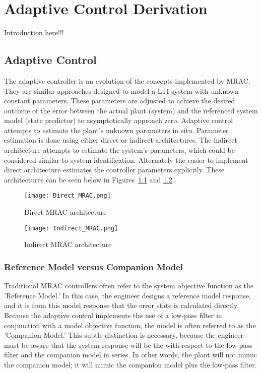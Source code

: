 \chapter{\Lone Adaptive Control Derivation}\label{ch:derivation}

Introduction here!!!

\section{\Lone Adaptive Control}
The \Lone adaptive controller is an evolution of the concepts implemented by \ac{MRAC}.  They are similar approaches designed to model a \ac{LTI} system with unknown constant parameters.  These parameters are adjusted to achieve the desired outcome of the error between the actual plant (system) and the referenced system model (state predictor) to asymptotically approach zero.   Adaptive control attempts to estimate the plant's unknown parameters in situ.  Parameter estimation is done using either direct or indirect architectures.  The indirect architecture attempts to estimate the system's parameters, which could be considered similar to  system identification.  Alternately the easier to implement direct architecture estimates the controller parameters explicitly.  These architectures can be seen below in Figures~\ref{fig:direct_mrac} and \ref{fig:indirect_mrac}.

\begin{figure}[h!]
 \centering
  \texttt{[image: Direct\_MRAC.png]}
  \caption{Direct \ac{MRAC} architecture }
  \label{fig:direct_mrac}
\end{figure}

\begin{figure}[h!]
 \centering
  \texttt{[image: Indirect\_MRAC.png]}
  \caption{Indirect \ac{MRAC} architecture }
  \label{fig:indirect_mrac}
\end{figure}

\subsection{Reference Model versus Companion Model}
Traditional \ac{MRAC} controllers often refer to the system objective function as the 'Reference Model.'  In this case, the engineer designs a reference model response, and it is from this model response that the error state is calculated directly.  Because the \Lone adaptive control implements the use of a low-pass filter in conjunction with a model objective function, the model is often referred to as the 'Companion Model.'  This subtle distinction is necessary, because the engineer must be aware that the system response will be the with respect to the low-pass filter and the companion model in series.  In other words, the plant will not mimic the companion model; it will mimic the companion model plus the low-pass filter.

